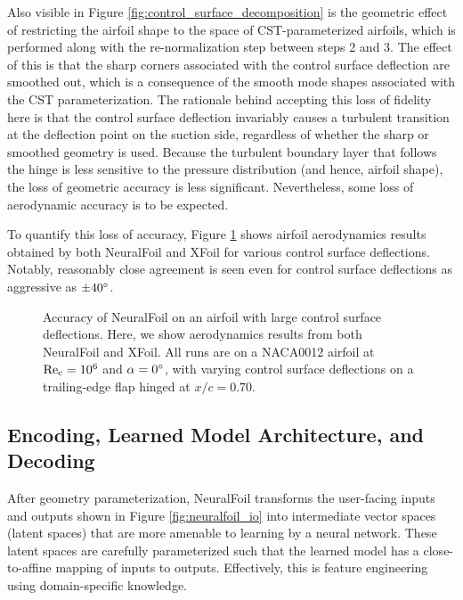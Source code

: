     Also visible in Figure \ref{fig:control_surface_decomposition} is the geometric effect of restricting the airfoil shape to the space of CST-parameterized airfoils, which is performed along with the re-normalization step between steps 2 and 3. The effect of this is that the sharp corners associated with the control surface deflection are smoothed out, which is a consequence of the smooth mode shapes associated with the CST parameterization. The rationale behind accepting this loss of fidelity here is that the control surface deflection invariably causes a turbulent transition at the deflection point on the suction side, regardless of whether the sharp or smoothed geometry is used. Because the turbulent boundary layer that follows the hinge is less sensitive to the pressure distribution (and hence, airfoil shape), the loss of geometric accuracy is less significant. Nevertheless, some loss of aerodynamic accuracy is to be expected.

    To quantify this loss of accuracy, Figure \ref{fig:control_surface_accuracy} shows airfoil aerodynamics results obtained by both NeuralFoil and XFoil for various control surface deflections. Notably, reasonably close agreement is seen even for control surface deflections as aggressive as $\pm40 \degree$.

    \begin{figure}[H]
        \centering
                \caption{Accuracy of NeuralFoil on an airfoil with large control surface deflections. Here, we show aerodynamics results from both NeuralFoil and XFoil. All runs are on a NACA0012 airfoil at $\rm Re_c = 10^6$ and $\alpha = 0\degree$, with varying control surface deflections on a trailing-edge flap hinged at $x/c=0.70$.}
        \label{fig:control_surface_accuracy}
    \end{figure}

    \subsection{Encoding, Learned Model Architecture, and Decoding}

    After geometry parameterization, NeuralFoil transforms the user-facing inputs and outputs shown in Figure \ref{fig:neuralfoil_io} into intermediate vector spaces (latent spaces) that are more amenable to learning by a neural network. These latent spaces are carefully parameterized such that the learned model has a close-to-affine mapping of inputs to outputs. Effectively, this is feature engineering using domain-specific knowledge.

